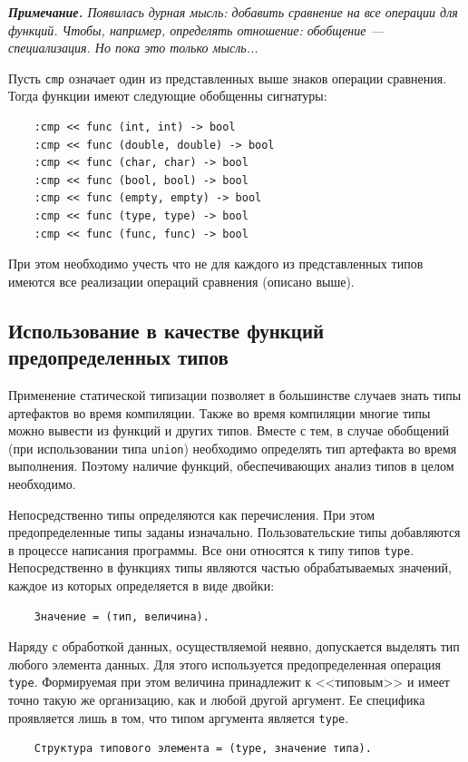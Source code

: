 \textit{\textbf{Примечание.}
Появилась дурная мысль: добавить сравнение на все операции для функций. Чтобы, например, определять отношение: обобщение --- специализация. Но пока это только мысль...}

Пусть \verb|cmp| означает один из представленных выше знаков операции сравнения. Тогда функции имеют следующие обобщенны сигнатуры:
\begin{verbatim}
    :cmp << func (int, int) -> bool
    :cmp << func (double, double) -> bool
    :cmp << func (char, char) -> bool
    :cmp << func (bool, bool) -> bool
    :cmp << func (empty, empty) -> bool
    :cmp << func (type, type) -> bool
    :cmp << func (func, func) -> bool
\end{verbatim}
При этом необходимо учесть что не для каждого из представленных типов имеются все реализации операций сравнения (описано выше).

\subsection{Использование в качестве функций предопределенных типов}

Применение статической типизации позволяет в большинстве случаев знать типы артефактов во время компиляции. Также во время компиляции многие типы можно вывести из функций и других типов. Вместе с тем, в случае обобщений (при использовании типа \verb|union|) необходимо определять тип артефакта во время выполнения. Поэтому наличие функций, обеспечивающих анализ типов в целом необходимо.

Непосредственно типы определяются как перечисления. При этом предопределенные типы заданы изначально. Пользовательские типы добавляются в процессе написания программы. Все они относятся к типу типов \verb|type|. Непосредственно в функциях типы являются частью обрабатываемых значений, каждое из которых определяется в виде двойки:
\begin{verbatim}
    Значение = (тип, величина).
\end{verbatim}

Наряду с обработкой данных, осуществляемой неявно, допускается выделять тип любого элемента данных. Для этого используется предопределенная операция \verb|type|. Формируемая при этом величина принадлежит к <<типовым>> и имеет точно такую же организацию, как и любой другой аргумент. Ее специфика проявляется лишь в том, что типом аргумента является \verb|type|.
\begin{verbatim}
    Структура типового элемента = (type, значение типа).
\end{verbatim}

